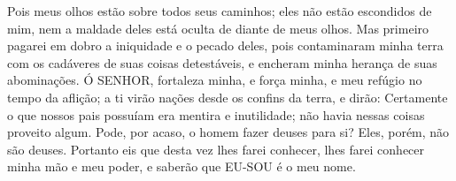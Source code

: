 {Pois meus olhos estão sobre todos seus caminhos; eles não estão escondidos de mim, nem a maldade deles está oculta de diante de meus olhos.
Mas primeiro pagarei em dobro a iniquidade e o pecado deles, pois contaminaram minha terra com os cadáveres de suas coisas detestáveis, e encheram minha herança de suas abominações.
Ó SENHOR, fortaleza minha, e força minha, e meu refúgio no tempo da aflição; a ti virão nações desde os confins da terra, e dirão: Certamente o que nossos pais possuíam era mentira e inutilidade; não havia nessas coisas proveito algum.
Pode, por acaso, o homem fazer deuses para si? Eles, porém, não são deuses.
Portanto eis que desta vez lhes farei conhecer, lhes farei conhecer minha mão e meu poder, e saberão que EU-SOU é o meu nome.

\par }

